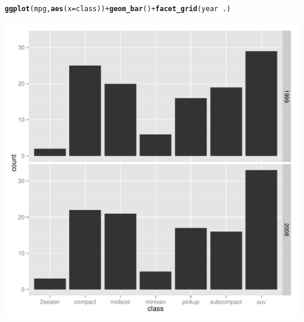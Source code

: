 \documentclass{article}\usepackage[]{graphicx}\usepackage[]{color}
\makeatletter
\def\maxwidth{ %
  \ifdim\Gin@nat@width>\linewidth
    \linewidth
  \else
    \Gin@nat@width
  \fi
}
\newcommand{\hlopt}[1]{\textcolor[rgb]{0,0,0}{#1}}%
\newcommand{\hlstd}[1]{\textcolor[rgb]{0.345,0.345,0.345}{#1}}%
\newcommand{\hlkwc}[1]{\textcolor[rgb]{0.333,0.667,0.333}{#1}}%
\newcommand{\hlkwd}[1]{\textcolor[rgb]{0.737,0.353,0.396}{\textbf{#1}}}%
\newenvironment{kframe}{%
 \def\at@end@of@kframe{}%
 \ifinner\ifhmode%
  \def\at@end@of@kframe{\end{minipage}}%
  \begin{minipage}{\columnwidth}%
 \fi\fi%
 \def\FrameCommand##1{\hskip\@totalleftmargin \hskip-\fboxsep
 \colorbox{shadecolor}{##1}\hskip-\fboxsep
     \hskip-\linewidth \hskip-\@totalleftmargin \hskip\columnwidth}%
 \MakeFramed {\advance\hsize-\width
   \@totalleftmargin\z@ \linewidth\hsize
   \@setminipage}}%
 {\par\unskip\endMakeFramed%
 \at@end@of@kframe}
\newenvironment{knitrout}{}{} %
\makeatother
\begin{document}
\begin{knitrout}
\color{fgcolor}\begin{kframe}
\begin{alltt}
\hlkwd{ggplot}\hlstd{(mpg,} \hlkwd{aes}\hlstd{(}\hlkwc{x}\hlstd{=class))} \hlopt{+} \hlkwd{geom_bar}\hlstd{()} \hlopt{+} \hlkwd{facet_grid}\hlstd{(year} \hlopt{~} \hlstd{.)}
\end{alltt}
\end{kframe}
\includegraphics[width=\maxwidth]{figure/explo5-1} 

\end{knitrout}
\end{document}

